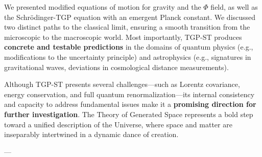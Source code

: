 \documentclass[11pt,a4paper]{article}
\begin{document}
We presented modified equations of motion for gravity and the $\Phi$ field, as well as the Schrödinger-TGP equation with an emergent Planck constant. We discussed two distinct paths to the classical limit, ensuring a smooth transition from the microscopic to the macroscopic world. Most importantly, TGP-ST produces \textbf{concrete and testable predictions} in the domains of quantum physics (e.g., modifications to the uncertainty principle) and astrophysics (e.g., signatures in gravitational waves, deviations in cosmological distance measurements).

Although TGP-ST presents several challenges—such as Lorentz covariance, energy conservation, and full quantum renormalization—its internal consistency and capacity to address fundamental issues make it a \textbf{promising direction for further investigation}. The Theory of Generated Space represents a bold step toward a unified description of the Universe, where space and matter are inseparably intertwined in a dynamic dance of creation.

---
\end{document}
